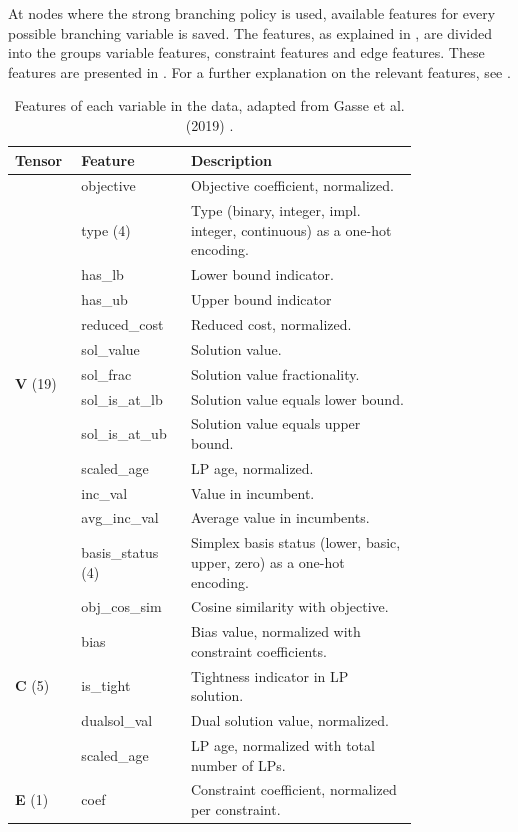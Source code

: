 At nodes where the strong branching policy is used, available features for every possible branching variable is saved. The features, as explained in , are divided into the groups variable features, constraint features and edge features. These features are presented in 
 . For a further explanation on the relevant features, see .
%
\renewcommand{\arraystretch}{1.5}
\begin{table}
	\centering
	\begin{tabular}{p{0.1\linewidth}p{0.2\linewidth}p{0.5\linewidth}}%
		\toprule
		  \textbf{Tensor} & \textbf{Feature} & \textbf{Description} \\ 
		  \toprule
		  \multirow{13}{*}{\textbf{V} (19)} & objective & Objective coefficient, normalized.  \\
		  & type (4) & Type (binary, integer, impl. integer, continuous) as a one-hot encoding. \\
		  & has\_lb & Lower bound indicator. \\
		  & has\_ub & Upper bound indicator \\
		  & reduced\_cost & Reduced cost, normalized. \\
		  & sol\_value & Solution value. \\
          & sol\_frac  & Solution value fractionality.\\
		  & sol\_is\_at\_lb & Solution value equals lower bound.\\
		  & sol\_is\_at\_ub & Solution value equals upper bound.\\
		  & scaled\_age & LP age, normalized. \\
          & inc\_val & Value in incumbent.\\
          & avg\_inc\_val & Average value in incumbents.\\
		  & basis\_status (4) & Simplex basis status (lower, basic, upper, zero) as a one-hot encoding.\\
		  \midrule
		  \multirow{5}{*}{\textbf{C} (5)} & obj\_cos\_sim & Cosine similarity with objective. \\
		  & bias & Bias value, normalized with constraint coefficients. \\
		  & is\_tight & Tightness indicator in LP solution. \\
		  & dualsol\_val & Dual solution value, normalized. \\
		  & scaled\_age & LP age, normalized with total number of LPs. \\
		  \midrule
		  \multirow{1}{*}{\textbf{E} (1)} & coef & Constraint coefficient, normalized per constraint. \\
		\bottomrule
	\end{tabular}
	\caption{Features of each variable in the data, adapted from Gasse et al. (2019) \cite{gasse2019exact}.}\label{tab:feats}
\end{table}
